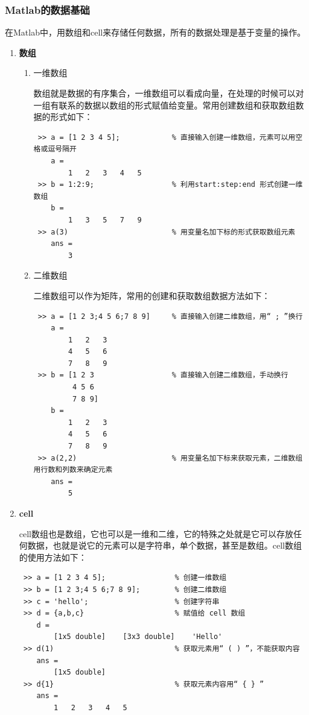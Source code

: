 \subsubsection{Matlab的数据基础}
在Matlab中，用数组和cell来存储任何数据，所有的数据处理是基于变量的操作。
\begin{enumerate}
	\item \textbf{数组}
	\begin{enumerate}
		\item 一维数组
		
		\qquad 数组就是数据的有序集合，一维数组可以看成向量，在处理的时候可以对一组有联系的数据以数组的形式赋值给变量。常用创建数组和获取数组数据的形式如下：
		\begin{lstlisting}
 >> a = [1 2 3 4 5];			% 直接输入创建一维数组，元素可以用空格或逗号隔开
    a = 
		1	2	3	4	5
 >> b = 1:2:9;					% 利用start:step:end 形式创建一维数组
	b =
		1	3	5	7	9
 >> a(3)						% 用变量名加下标的形式获取数组元素
 	ans = 
 		3\end{lstlisting}
		\item 二维数组
		
		\qquad 二维数组可以作为矩阵，常用的创建和获取数组数据方法如下：
		\begin{lstlisting}
 >> a = [1 2 3;4 5 6;7 8 9]		% 直接输入创建二维数组，用“ ; ”换行
    a = 
    	1	2	3
    	4	5	6
    	7	8	9
 >> b = [1 2 3					% 直接输入创建二维数组，手动换行
 		 4 5 6
 		 7 8 9]
	b = 
	 	1	2	3
	 	4	5	6
	 	7	8	9
 >> a(2,2)						% 用变量名加下标来获取元素，二维数组用行数和列数来确定元素
 	ans = 
 		5\end{lstlisting}
	\end{enumerate}
	\item \textbf{cell}
	
	\qquad cell数组也是数组，它也可以是一维和二维，它的特殊之处就是它可以存放任何数据，也就是说它的元素可以是字符串，单个数据，甚至是数组。cell数组的使用方法如下：
	\begin{lstlisting}
 >> a = [1 2 3 4 5];				% 创建一维数组
 >> b = [1 2 3;4 5 6;7 8 9];		% 创建二维数组
 >> c = 'hello';					% 创建字符串
 >> d = {a,b,c}						% 赋值给 cell 数组
 	d = 
 		[1x5 double]	[3x3 double]	'Hello'
 >> d(1)							% 获取元素用“ ( ) ”，不能获取内容
 	ans =
 		[1x5 double]
 >> d{1}							% 获取元素内容用“ { } ”
 	ans =
 		1	2	3	4	5\end{lstlisting}
\end{enumerate}
